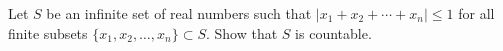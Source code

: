 Let $S$ be an infinite set of real numbers such that $|x_1+x_2+\cdots + x_n | \leq 1 $ for all finite subsets $\{x_1,x_2,\ldots,x_n\} \subset S$. Show that $S$ is countable.